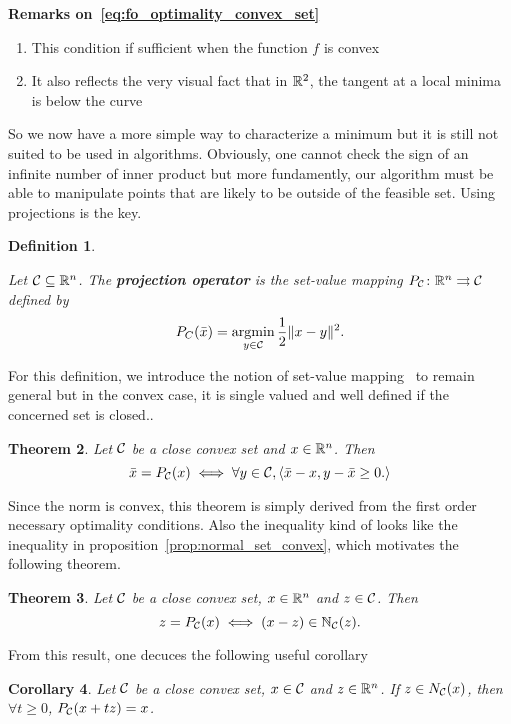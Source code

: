 \documentclass[10pt]{article}
\newtheorem{theorem}{Theorem}[]
\newtheorem{definition}[theorem]{Definition}
\newtheorem{corollary}[theorem]{Corollary}
\numberwithin{equation}{section}
\begin{document}
	\textbf{Remarks on~\eqref{eq:fo_optimality_convex_set}}
	\begin{enumerate}
		\item This condition if sufficient when the function $f$ is convex
		\item It also reflects the very visual fact that in ${\mathbb{R}}^2$, the tangent at a local minima is below the curve
	\end{enumerate}
	
	So we now have a more simple way to characterize a minimum but it is still not suited to be used in algorithms. Obviously, one cannot check the sign of an infinite number of inner product but more fundamently, our algorithm must be able to manipulate points that are likely to be outside of the feasible set. Using projections is the key.
	
	\begin{definition}\label{def:projection}
		
		Let ${\mathcal{C}} \subseteq {\mathbb{R}}^n$. The \textbf{projection operator} is the set-value mapping $P_{\mathcal{C}} \colon {\mathbb{R}}^n \rightrightarrows {\mathcal{C}} $ defined by
		\[ P_C(\bar{x}) = \operatorname*{argmin}_{y \in {\mathcal{C}}}  \dfrac{1}{2} \|x-y\|^2.\]
	\end{definition}
	
	For this definition, we introduce the notion of set-value mapping~\cite{rockafellarwets:1998} to remain general but in the convex case, it is single valued and well defined if the concerned set is closed.. 
	
	\begin{theorem}
		Let ${\mathcal{C}}$ be a close convex set and $x \in {\mathbb{R}}^n$. Then
		\[\bar{x} = P_{\mathcal{C}}(x) \iff \forall y \in {\mathcal{C}}, \left\langle {\bar{x}-x} , {y-\bar{x} \ge 0.} \right\rangle\]
	\end{theorem}
	
	Since the norm is convex, this theorem is simply derived from the first order necessary optimality  conditions. Also the inequality kind of looks like the inequality in proposition~\eqref{prop:normal_set_convex}, which motivates the following theorem.
	
	\begin{theorem}
		Let ${\mathcal{C}}$ be a close convex set, $x \in {\mathbb{R}}^n$ and $z \in {\mathcal{C}}$. Then
		\[z = P_{\mathcal{C}}(x) \iff (x-z) \in {\mathbb{N}}_{\mathcal{C}}(z).\]
	\end{theorem}
	
	From this result, one decuces the following useful corollary
	
	\begin{corollary}
		Let ${\mathcal{C}}$ be a close convex set, $x \in {\mathcal{C}}$ and $z \in {\mathbb{R}}^n$. If $z \in N_{\mathcal{C}}(x)$, then $\forall t\ge 0$, $P_{\mathcal{C}}(x+tz)=x$.
	\end{corollary}
	
\end{document}

